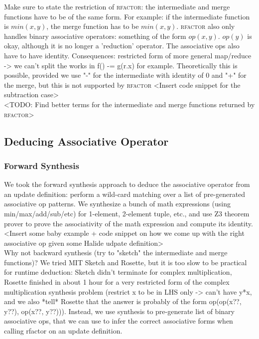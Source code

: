 Make sure to state the restriction of \textsc{rfactor}: the intermediate and merge functions have to be of the same form. For example: if the intermediate function is $min(x, y)$, the merge function has to be $min(x, y)$. \textsc{rfactor} also only handles binary associative operators: something of the form $op(x, y)$. $op(y)$ is okay, although it is no longer a 'reduction' operator. The associative ops also have to have identity. Consequences: restricted form of more general map/reduce -> we can't split the works in f() -= g(r.x) for example. Theoretically this is possible, provided we use "-" for the intermediate with identity of 0 and "+" for the merge, but this is not supported by \textsc{rfactor} <Insert code snippet for the subtraction case> \\

<TODO: Find better terms for the intermediate and merge functions returned by \textsc{rfactor}> \\

\subsection{Deducing Associative Operator}

\subsubsection{Forward Synthesis}

We took the forward synthesis approach to deduce the associative operator from an update definition: perform a wild-card matching over a list of pre-generated associative op patterns. We synthesize a bunch of math expressions (using min/max/add/sub/etc) for 1-element, 2-element tuple, etc., and use Z3 theorem prover \cite{DeMoura:2008:ZES:1792734.1792766} to prove the associativity of the math expression and compute its identity. \\

<Insert some baby example + code snippet on how we come up with the right associative op given some Halide udpate definition> \\

Why not backward synthesis (try to "sketch" the intermediate and merge functions)? We tried MIT Sketch and Rosette, but it is too slow to be practical for runtime deduction: Sketch didn't terminate for complex multiplication, Rosette finished in about 1 hour for a very restricted form of the complex multiplication synthesis problem (restrict x to be in LHS only -> can't have y*x, and we also *tell* Rosette that the answer is probably of the form op(op(x??, y??), op(x??, y??))). Instead, we use synthesis to pre-generate list of binary associative ops, that we can use to infer the correct associative forms when calling rfactor on an update definition. \\

